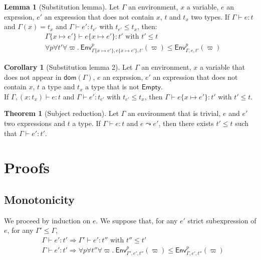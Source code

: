 \documentclass[a4paper]{article}%
\newcommand{\dom}[1]{\textsf{dom}(#1)}
\newcommand{\Empty} {\textsf{Empty}}%
\newcommand{\subst}[2]{\{#1 \mapsto #2\}}
\newcommand{\Gp}[2]{\textsf{Env}^{#1}_{#2}}
\theoremstyle{definition}
\newtheorem{theorem}{Theorem}
\newtheorem{lemma}{Lemma}
\newtheorem{corollary}{Corollary}
\begin{document}
    \begin{lemma}[Substitution lemma]
      Let $\Gamma$ an environment, $x$ a variable, $e$ an exprssion, $e'$ an expression that does not contain $x$, $t$ and $t_x$ two types.
      If $\Gamma \vdash e:t$ and $\Gamma(x) = t_x$ and $\Gamma \vdash e':t_{e'}$ with $t_{e'} \leq t_x$, then:
      \begin{align*}
        &\Gamma \subst x {e'} \vdash e \subst x {e'}:t' \text{ with } t'\leq t\\
        &\forall p \forall t' \forall \varpi.\ \Gp p {\Gamma\subst x {e'},e\subst x {e'},t'} (\varpi) \leq \Gp p {\Gamma,e,t'} (\varpi)
      \end{align*}
    \end{lemma}

    \begin{corollary}[Substitution lemma 2]
      Let $\Gamma$ an environment, $x$ a variable that does not appear in $\dom \Gamma$, $e$ an exprssion, $e'$ an expression that does not contain $x$, $t$ a type and $t_x$ a type that is not $\Empty$.\\
      If $\Gamma, (x:t_x) \vdash e:t$ and $\Gamma \vdash e':t_{e'}$ with $t_{e'} \leq t_x$, then $\Gamma \vdash e \subst x {e'}:t'$ with $t'\leq t$.
    \end{corollary}

    \begin{theorem}[Subject reduction]
      Let $\Gamma$ an environment that is trivial, $e$ and $e'$ two expressions and $t$ a type.
      If $\Gamma \vdash e : t$ and $e \leadsto e'$, then there exists $t' \leq t$ such that $\Gamma \vdash e' : t'$.
    \end{theorem}

    \section{Proofs}

    \subsection{Monotonicity}

    We proceed by induction on $e$. We suppose that, for any $e'$ strict subexpression of $e$, for any $\Gamma' \leq \Gamma$,
    \begin{align*}
      &\Gamma \vdash e':t' \Rightarrow \Gamma' \vdash e':t'' \text{ with } t'' \leq t'\\
      &\Gamma \vdash e':t' \Rightarrow \forall p \forall t'' \forall \varpi.\ \Gp p {\Gamma',e',t''} (\varpi) \leq \Gp p {\Gamma,e',t''} (\varpi)
    \end{align*}
\end{document}
